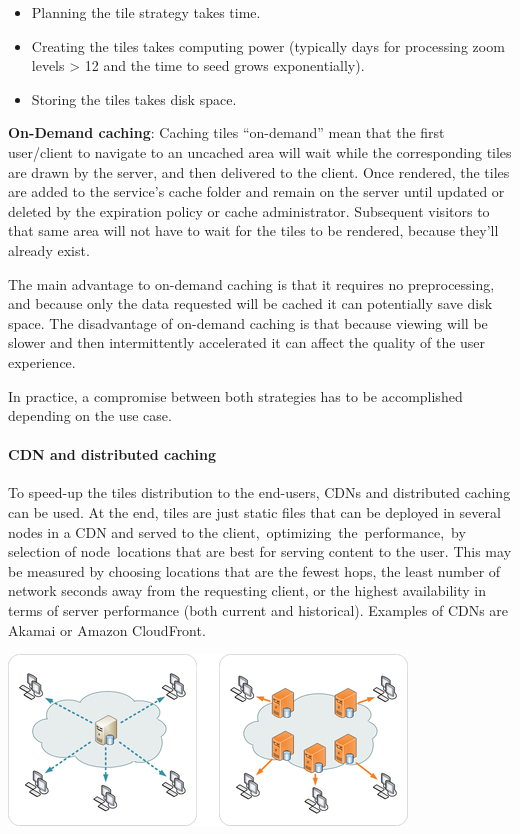 \documentclass[a4paper]{article}
\newcommand\liststyleLFOxxii{%
\renewcommand\labelitemi{[F0B7?]}
\renewcommand\labelitemii{o}
\renewcommand\labelitemiii{[F0A7?]}
\renewcommand\labelitemiv{[F0B7?]}
}
\begin{document}
\liststyleLFOxxii
\begin{itemize}
\item Planning the tile strategy takes time.
\item Creating the tiles takes computing power (typically days for
processing zoom levels {\textgreater} 12 and the time to seed grows
exponentially).
\item Storing the tiles takes disk space.
\end{itemize}
\textbf{On-Demand caching}: Caching tiles
{\textquotedblleft}on-demand{\textquotedblright} mean that the first
user/client to navigate to an uncached area will wait while the
corresponding tiles are drawn by the server, and then delivered to the
client. Once rendered, the tiles are added to the
service{\textquoteright}s cache folder and remain on the server until
updated or deleted by the expiration policy or cache administrator.
Subsequent visitors to that same area will not have to wait for the
tiles to be rendered, because they{\textquoteright}ll already exist.

The main advantage to on-demand caching is that it requires no
preprocessing, and because only the data requested will be cached it
can potentially save disk space. The disadvantage of on-demand caching
is that because viewing will be slower and then intermittently
accelerated it can affect the quality of the user experience.

In practice, a compromise between both strategies has to be accomplished
depending on the use case.

\paragraph[CDN and distributed caching]{CDN and distributed caching}
To speed-up the tiles distribution to the end-users, CDNs and
distributed caching can be used. At the end, tiles are just static
files that can be deployed in several nodes in a CDN and served to the
client,\ optimizing\ the\ performance,\ by selection of node\ locations
that are best for serving content to the user. This may be measured by
choosing locations that are the fewest hops, the least number of
network seconds away from the requesting client, or the highest
availability in terms of server performance (both current and
historical). Examples of CDNs are Akamai or Amazon CloudFront.

{\centering 
\includegraphics[width=4.16528in,height=1.79097in]{out-img21.png} \par}
\end{document}

